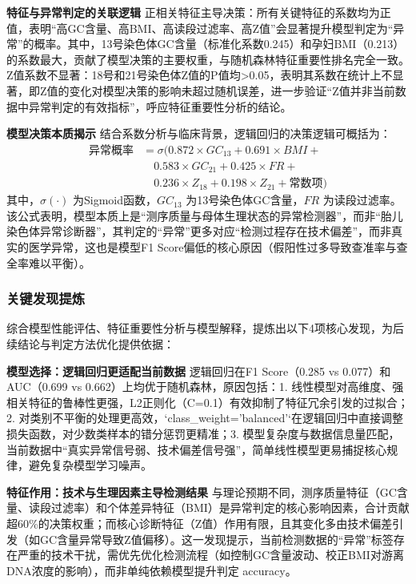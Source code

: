 \documentclass[withoutpreface,bwprint]{cumcmthesis} %
\begin{document}
\textbf{特征与异常判定的关联逻辑}
正相关特征主导决策：所有关键特征的系数均为正值，表明“高GC含量、高BMI、高读段过滤率、高Z值”会显著提升模型判定为“异常”的概率。其中，13号染色体GC含量（标准化系数0.245）和孕妇BMI（0.213）的系数最大，贡献了模型决策的主要权重，与随机森林特征重要性排名完全一致。  
Z值系数不显著：18号和21号染色体Z值的P值均>0.05，表明其系数在统计上不显著，即Z值的变化对模型决策的影响未超过随机误差，进一步验证“Z值并非当前数据中异常判定的有效指标”，呼应特征重要性分析的结论。


\textbf{模型决策本质揭示}
结合系数分析与临床背景，逻辑回归的决策逻辑可概括为：  
\begin{align}
\text{异常概率} &= \sigma( 0.872 \times GC_{13} + 0.691 \times BMI + \\
&\quad 0.583 \times GC_{21} + 0.425 \times FR + \\
&\quad 0.236 \times Z_{18} + 0.198 \times Z_{21} + \text{常数项} )
\tag{1}
\end{align}
其中，\( \sigma(\cdot) \) 为Sigmoid函数，\( GC_{13} \) 为13号染色体GC含量，\( FR \) 为读段过滤率。该公式表明，模型本质上是“测序质量与母体生理状态的异常检测器”，而非“胎儿染色体异常诊断器”，其判定的“异常”更多对应“检测过程存在技术偏差”，而非真实的医学异常，这也是模型F1 Score偏低的核心原因（假阳性过多导致查准率与查全率难以平衡）。


\subsubsection{关键发现提炼}
综合模型性能评估、特征重要性分析与模型解释，提炼出以下4项核心发现，为后续结论与判定方法优化提供依据：

\textbf{模型选择：逻辑回归更适配当前数据}
逻辑回归在F1 Score（0.285 vs 0.077）和AUC（0.699 vs 0.662）上均优于随机森林，原因包括：1. 线性模型对高维度、强相关特征的鲁棒性更强，L2正则化（C=0.1）有效抑制了特征冗余引发的过拟合；2. 对类别不平衡的处理更高效，`class\_weight='balanced'`在逻辑回归中直接调整损失函数，对少数类样本的错分惩罚更精准；3. 模型复杂度与数据信息量匹配，当前数据中“真实异常信号弱、技术偏差信号强”，简单线性模型更易捕捉核心规律，避免复杂模型学习噪声。

\textbf{特征作用：技术与生理因素主导检测结果}
与理论预期不同，测序质量特征（GC含量、读段过滤率）和个体差异特征（BMI）是异常判定的核心影响因素，合计贡献超60\%的决策权重；而核心诊断特征（Z值）作用有限，且其变化多由技术偏差引发（如GC含量异常导致Z值偏移）。这一发现提示，当前检测数据的“异常”标签存在严重的技术干扰，需优先优化检测流程（如控制GC含量波动、校正BMI对游离DNA浓度的影响），而非单纯依赖模型提升判定 accuracy。
\end{document}
